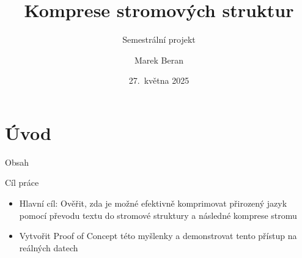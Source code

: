 \documentclass[lualatex,hyperref={pdfencoding=auto}]{beamer}
\title[Komprese stromových struktur]{Komprese stromových struktur}
\subtitle{Semestrální projekt}
\author{Marek Beran}
\institute[VŠB-TUO]{VŠB -- Technická univerzita Ostrava\\\vspace{2mm}marek.beran.st@vsb.cz}
\date[27.~5.~2025]{27.~května 2025}
\begin{document}
\section{Úvod}

\begin{frame}{Obsah}
    \tableofcontents
\end{frame}

\begin{frame}{Cíl práce}
\begin{itemize}
  \item Hlavní cíl: Ověřit, zda je možné efektivně komprimovat přirozený jazyk pomocí převodu textu do stromové struktury a následné komprese stromu
  \item Vytvořit Proof of Concept této myšlenky a demonstrovat tento přístup na reálných datech
\end{itemize}

\end{frame}

            
\end{document}
